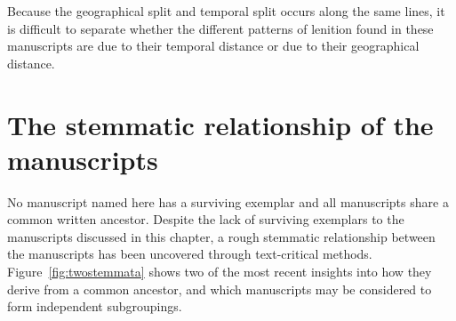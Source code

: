 Because the geographical split and temporal split occurs along the same lines, it is difficult to separate whether the different patterns of lenition found in these manuscripts are due to their temporal distance or due to their geographical distance.

\section{The stemmatic relationship of the manuscripts}
\label{sec:stemmata}
No manuscript named here has a surviving exemplar and all manuscripts share a common written ancestor. Despite the lack of surviving exemplars to the manuscripts discussed in this chapter, a rough stemmatic relationship between the manuscripts has been uncovered through text-critical methods. Figure~\ref{fig:twostemmata} shows two of the most recent insights into how they derive from a common ancestor, and which manuscripts may be considered to form independent subgroupings.


